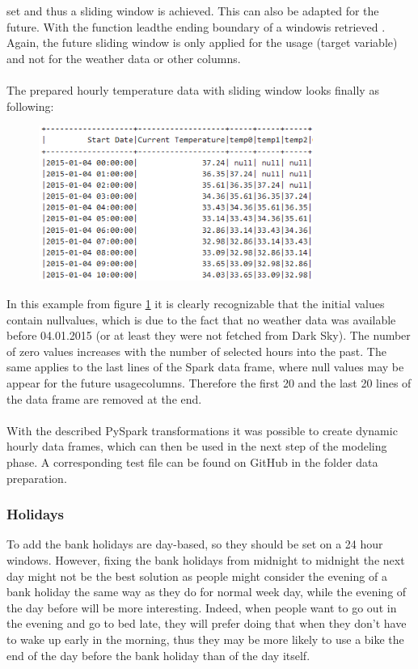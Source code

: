 set and thus a sliding window is achieved. This can also be adapted for the future. With the function
\glqq lead\grqq the ending boundary of a \glqq window\grqq is retrieved \cite{RN8}. Again, the future sliding window is only
applied for the usage (target variable) and not for the weather data or other columns.\\\\
The prepared hourly temperature data with sliding window looks finally as following:
\begin{figure}[H]
\centering
\includegraphics[width=0.8\textwidth]{img/figure8_temperature_df}\label{fig:figure8_temperature_df}
\label{fig:figure8_temperature_df}
\end{figure}
In this example from figure \ref{fig:figure8_temperature_df} it is clearly recognizable that the initial values contain \glqq null\grqq values, which is due to the fact that no weather data was available before 04.01.2015 (or at least they
were not fetched from Dark Sky). The number of zero values increases with the number of selected
hours into the past. The same applies to the last lines of the Spark data frame, where null values
may be appear for the \glqq future usage\grqq columns. Therefore the first 20 and the last 20 lines of the
data frame are removed at the end.\\\\
With the described PySpark transformations it was possible to create dynamic hourly data frames,
which can then be used in the next step of the modeling phase. A corresponding test file can be
found on GitHub in the folder data preparation.
\subsubsection{Holidays}

To add the bank holidays are day-based, so they should be set on a 24 hour windows.
However, fixing the bank holidays from midnight to midnight the next day might not
be the best solution as people might consider the evening of a bank holiday the same
way as they do for normal week day, while the evening of the day before will be more
interesting. Indeed, when people want to go out in the evening and go to bed late,
they will prefer doing that when they don't have to wake up early in the morning,
thus they may be more likely to use a bike the end of the day before the bank
holiday than of the day itself.

